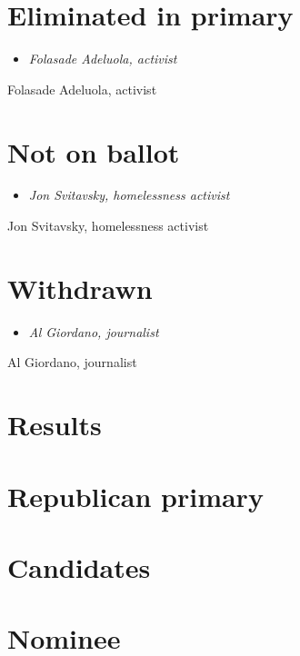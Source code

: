 \section{Eliminated in primary}\label{eliminated-in-primary}

\begin{itemize}
\item
  \emph{Folasade Adeluola, activist}
\end{itemize}

Folasade Adeluola, activist

\section{Not on ballot}\label{not-on-ballot}

\begin{itemize}
\item
  \emph{Jon Svitavsky, homelessness activist}
\end{itemize}

Jon Svitavsky, homelessness activist

\section{Withdrawn}\label{withdrawn}

\begin{itemize}
\item
  \emph{Al Giordano, journalist}
\end{itemize}

Al Giordano, journalist

\section{Results}\label{results}

\section{Republican primary}\label{republican-primary}

\section{Candidates}\label{candidates-2}

\section{Nominee}\label{nominee-1}

